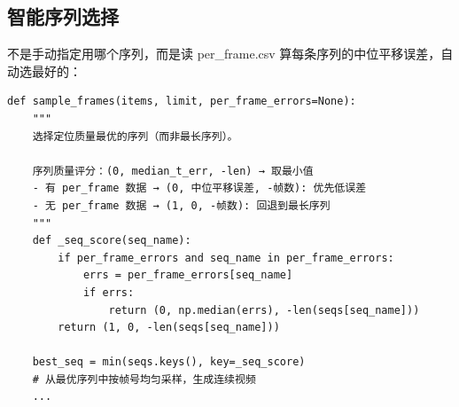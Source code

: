 \documentclass[12pt,a4paper]{ctexart}
\begin{document}
\subsection{智能序列选择}

不是手动指定用哪个序列，而是读 per\_frame.csv 算每条序列的中位平移误差，自动选最好的：

\begin{lstlisting}[style=pythonstyle, caption={智能序列选择}]
def sample_frames(items, limit, per_frame_errors=None):
    """
    选择定位质量最优的序列（而非最长序列）。

    序列质量评分：(0, median_t_err, -len) → 取最小值
    - 有 per_frame 数据 → (0, 中位平移误差, -帧数): 优先低误差
    - 无 per_frame 数据 → (1, 0, -帧数): 回退到最长序列
    """
    def _seq_score(seq_name):
        if per_frame_errors and seq_name in per_frame_errors:
            errs = per_frame_errors[seq_name]
            if errs:
                return (0, np.median(errs), -len(seqs[seq_name]))
        return (1, 0, -len(seqs[seq_name]))

    best_seq = min(seqs.keys(), key=_seq_score)
    # 从最优序列中按帧号均匀采样，生成连续视频
    ...
\end{lstlisting}

\end{document}
